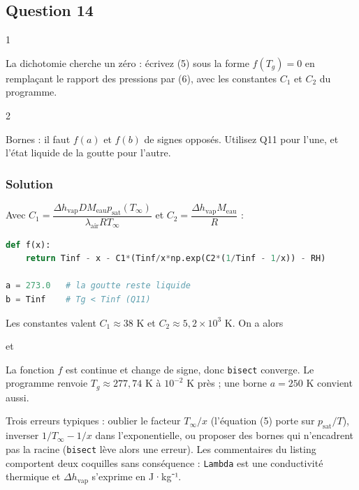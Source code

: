 \documentclass[11pt,a4paper]{article}
\newcommand{\equationajustee}[1]{%
  \sbox{\boiteequation}{$\displaystyle #1$}%
  \ifdim\wd\boiteequation>\linewidth
    \[\resizebox{\linewidth}{!}{\usebox{\boiteequation}}\]%
  \else
    \[#1\]%
  \fi}
\begin{document}
\hypertarget{question-14}{%
\subsection{Question 14}\label{question-14}}

\begin{indication}{1}

La dichotomie cherche un zéro : écrivez (5) sous la forme \(f(T_g)=0\) en remplaçant le rapport des pressions par (6), avec les constantes \(C_1\) et \(C_2\) du programme.

\end{indication}

\begin{indication}{2}

Bornes : il faut \(f(a)\) et \(f(b)\) de signes opposés. Utilisez Q11 pour l'une, et l'état liquide de la goutte pour l'autre.

\end{indication}

\hypertarget{solution-13}{%
\subsubsection{Solution}\label{solution-13}}

Avec \(C_1=\dfrac{\Delta h_{\text{vap}}DM_{\text{eau}}p_{\text{sat}}(T_\infty)}{\lambda_{\text{air}}RT_\infty}\) et \(C_2=\dfrac{\Delta h_{\text{vap}}M_{\text{eau}}}R\) :

\begin{lstlisting}[language=Python]
def f(x):
    return Tinf - x - C1*(Tinf/x*np.exp(C2*(1/Tinf - 1/x)) - RH)

a = 273.0   # la goutte reste liquide
b = Tinf    # Tg < Tinf (Q11)
\end{lstlisting}

Les constantes valent \(C_1\approx38\) K et \(C_2\approx5{,}2\times10^3\) K. On a alors

\equationajustee{f(b)=-C_1(1-\mathcal R_H)<0}

et

\equationajustee{f(273)\approx+8{,}8>0 .}

La fonction \(f\) est continue et change de signe, donc \texttt{bisect} converge. Le programme renvoie \(T_g\approx277{,}74\) K à \(10^{-2}\) K près ; une borne \(a=250\) K convient aussi.

\begin{piege}

Trois erreurs typiques : oublier le facteur \(T_\infty/x\) (l'équation (5) porte sur \(p_{\text{sat}}/T\)), inverser \(1/T_\infty-1/x\) dans l'exponentielle, ou proposer des bornes qui n'encadrent pas la racine (\texttt{bisect} lève alors une erreur). Les commentaires du listing comportent deux coquilles sans conséquence : \texttt{Lambda} est une conductivité thermique et \(\Delta h_{\text{vap}}\) s'exprime en J·kg⁻¹.

\end{piege}
\end{document}
